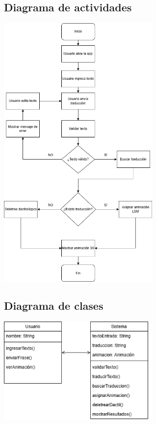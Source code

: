 \subsection{Diagrama de actividades}
\begin{center}
    \includegraphics[width=0.6\textwidth]{Images/Cap 3/Actividades.png}
\end{center}
\subsection{Diagrama de clases}
\begin{center}
    \includegraphics[width=0.6\textwidth]{Images/Cap 3/Clases.png}
\end{center}

